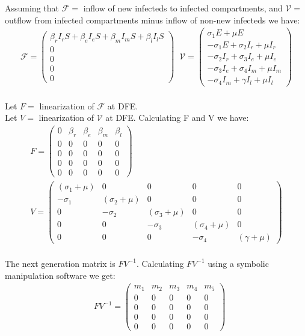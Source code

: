Assuming that $\mathcal{F} =$ inflow of new infecteds to infected compartments, and $\mathcal{V} =$ outflow from infected compartments minus inflow of non-new infecteds we have:
\begin{gather*}
\mathcal{F} = \left(\begin{array}{c}
\beta_r I_r S+ \beta_e I_e S+ \beta_m I_m S+ \beta_l I_l S\\
0 \\
0 \\
0 \\
0
\end{array}\right) \;\;
\mathcal{V} = \left(\begin{array}{c}
\sigma_1 E + \mu E\\
-\sigma_1 E + \sigma_2 I_r + \mu I_r \\
-\sigma_2 I_r + \sigma_3 I_e + \mu I_e \\
-\sigma_3 I_e + \sigma_4 I_m + \mu I_m \\
-\sigma_4 I_m + \gamma I_l + \mu I_l
\end{array}\right)
\end{gather*}\\
Let $F=$ linearization of $\mathcal{F}$ at DFE.\\
Let $V=$ linearization of $\mathcal{V}$ at DFE. Calculating F and V we have:
\begin{gather*}
F=\left(\begin{array}{rrrrr}
0 & \beta_r & \beta_e & \beta_m & \beta_l \\
0 & 0 & 0 & 0 & 0 \\
0 & 0 & 0 & 0 & 0 \\
0 & 0 & 0 & 0 & 0 \\
0 & 0 & 0 & 0 & 0
\end{array}\right)\\
V=\left(\begin{array}{rrrrr}
(\sigma_1 + \mu) & 0 & 0 & 0 & 0 \\
-\sigma_1 & (\sigma_2 + \mu) & 0 & 0 & 0 \\
0 & -\sigma_2 & (\sigma_3 + \mu) & 0 & 0 \\
0 & 0 & -\sigma_3 & (\sigma_4 + \mu) & 0 \\
0 & 0 & 0 & -\sigma_4 & (\gamma + \mu)
\end{array}\right)
\end{gather*}\\
The next generation matrix is $FV^{-1}$. Calculating $FV^{-1}$ using a symbolic manipulation software we get:
\begin{align*}
&FV^{-1}= \left(\begin{array}{rrrrr}
m_1 & m_2 & m_3 & m_4 & m_5 \\
0 & 0 & 0 & 0 & 0 \\
0 & 0 & 0 & 0 & 0 \\
0 & 0 & 0 & 0 & 0 \\
0 & 0 & 0 & 0 & 0
\end{array}\right)\\
\end{align*}
